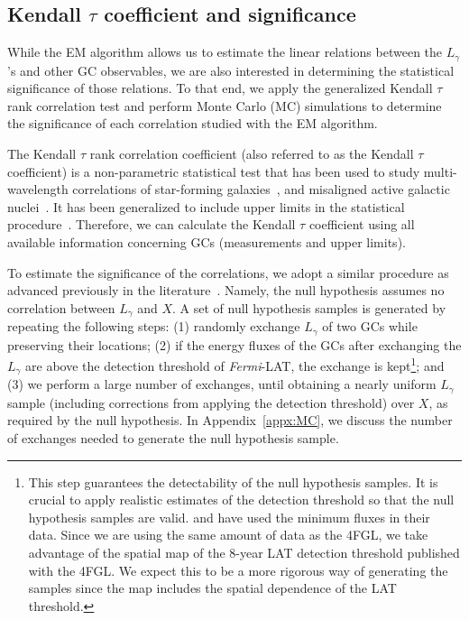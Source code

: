 \documentclass[doublespace,nopageskip]{VTthesis} %
\begin{document}
\subsection{Kendall $\tau$ coefficient and significance}\label{sec:kendall}

While the EM algorithm allows us to estimate the linear relations between the $L_\gamma$'s and other GC observables, we are also interested in determining the statistical significance of those relations. To that end, we apply the generalized Kendall $\tau$ rank correlation test and perform Monte Carlo (MC) simulations to determine the significance of each correlation studied with the EM algorithm. 

The Kendall $\tau$ rank correlation coefficient (also referred to as the Kendall $\tau$ coefficient) is a non-parametric statistical test that has been used to study multi-wavelength correlations of star-forming galaxies~\citep{2012ApJ...755..164A,2020ApJ...894...88A}, and misaligned active galactic nuclei~\citep{2014ApJ...780..161D}. It has been generalized to include upper limits in the statistical procedure~\citep{2012ApJ...755..164A}. Therefore, we can calculate the Kendall $\tau$ coefficient using all available information concerning GCs (measurements and upper limits).

To estimate the significance of the correlations, we adopt a similar procedure as advanced previously in the literature~\citep{2012ApJ...755..164A}. Namely, the null hypothesis assumes no correlation between $L_\gamma$ and $X$. A set of null hypothesis samples is generated by repeating the following steps: (1) randomly exchange $L_\gamma$ of two GCs while preserving their locations; (2) if the energy fluxes of the GCs after exchanging the $L_\gamma$ are above the detection threshold of \textit{Fermi}-LAT, the exchange is kept\footnote{This step guarantees the detectability of the null hypothesis samples. It is crucial to apply realistic estimates of the detection threshold so that the null hypothesis samples are valid. \citet{2012ApJ...755..164A} and \citet{2020ApJ...894...88A} have used the minimum fluxes in their data. Since we are using the same amount of data as the 4FGL, we take advantage of the spatial map of the 8-year LAT detection threshold published with the 4FGL. We expect this to be a more rigorous way of generating the samples since the map includes the spatial dependence of the LAT threshold.}; and (3) we perform a large number of exchanges, until obtaining a nearly uniform $L_\gamma$ sample (including corrections from applying the detection threshold) over $X$, as required by the null hypothesis. In Appendix~\ref{appx:MC}, we discuss the number of exchanges needed to generate the null hypothesis sample.
\end{document}
